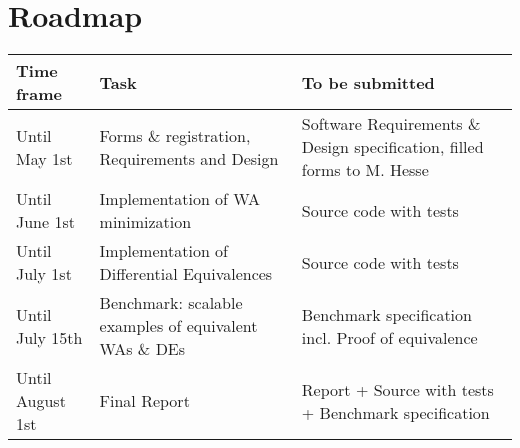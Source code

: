 \documentclass[11pt, rgb]{scrartcl}
\begin{document}
\section{Roadmap}
\centering
\begin{tabular}{l  p{6cm}  p{6cm}} \toprule
 Time frame & Task & To be submitted\\ \midrule
 Until May 1st & Forms \& registration, Requirements and Design & Software Requirements \& Design specification, filled forms to M. Hesse\\ \hline
 Until June 1st & Implementation of WA minimization & Source code with tests \\ \hline
 Until July 1st & Implementation of Differential Equivalences & Source code with tests \\ \hline
 Until July 15th & Benchmark: scalable examples of equivalent WAs \& DEs & Benchmark specification incl. Proof of equivalence \\ \hline
 Until August 1st & Final Report & Report + Source with tests + Benchmark specification \\ \bottomrule
\end{tabular}
\end{document}
